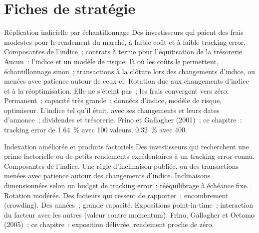 \section{Fiches de stratégie}

\begin{strategyfile}{Réplication indicielle par échantillonnage}\label{strat:s1:the-asset-managers-strategies:index}
 Des investisseurs qui paient des frais modestes pour le rendement du marché, à faible coût et à faible tracking error.
 Composantes de l'indice~; contrats à terme pour l'équitisation de la trésorerie.
 Aucun~: l'indice et un modèle de risque.
  là où les coûts le permettent, échantillonnage sinon~; transactions à la clôture lors des changements d'indice, ou menées avec patience autour de ceux-ci.
 Rotation due aux changements d'indice et à la réoptimisation.
 Elle ne s'éteint pas~; les frais convergent vers zéro.
 Permanent~; capacité très grande~; données d'indice, modèle de risque, optimiseur.
 L'indice tel qu'il était, avec ses changements et leurs dates d'annonce~; dividendes et trésorerie.
 Frino et Gallagher (2001)~; ce chapitre~: tracking error de 1.64~\% avec 100 valeurs, 0.32~\% avec 400.
\end{strategyfile}

\begin{strategyfile}{Indexation améliorée et produits factoriels}\label{strat:s1:the-asset-managers-strategies:enhanced}
 Des investisseurs qui recherchent une prime factorielle ou de petits rendements excédentaires à un tracking error connu.
 Composantes de l'indice.
 Une règle d'inclinaison publiée, ou des transactions menées avec patience autour des changements d'indice.
 Inclinaisons dimensionnées selon un budget de tracking error~; rééquilibrage à échéance fixe.
 Rotation modérée.
 Des facteurs qui cessent de rapporter~; encombrement (crowding).
 Des années~; grande capacité.
 Expositions point-in-time~; interaction du facteur avec les autres (valeur contre momentum).
 Frino, Gallagher et Oetomo (2005)~; ce chapitre~: exposition délivrée, rendement proche de zéro.
\end{strategyfile}

